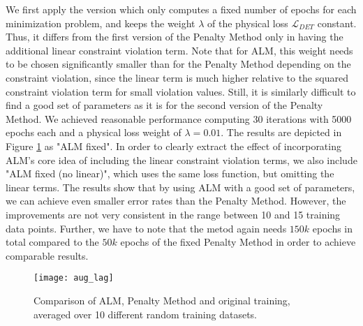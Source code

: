 We first apply the version which only computes a fixed number of epochs for each minimization problem, and keeps the weight $\lambda$ of the physical loss $\mathcal{L}_{DET}$ constant. Thus, it differs from the first version of the Penalty Method only in having the additional linear constraint violation term. Note that for ALM, this weight needs to be chosen significantly smaller than for the Penalty Method depending on the constraint violation, since the linear term is much higher relative to the squared constraint violation term for small violation values. Still, it is similarly difficult to find a good set of parameters as it is for the second version of the Penalty Method. We achieved reasonable performance computing 30 iterations with 5000 epochs each and a physical loss weight of $\lambda = 0.01$. The results are depicted in Figure \ref{fig:aug_lag} as "ALM fixed". In order to clearly extract the effect of incorporating ALM's core idea of including the linear constraint violation terms, we also include "ALM fixed (no linear)", which uses the same loss function, but omitting the linear terms. The results show that by using ALM with a good set of parameters, we can achieve even smaller error rates than the Penalty Method. However, the improvements are not very consistent in the range between 10 and 15 training data points. Further, we have to note that the metod again needs $150k$ epochs in total compared to the $50k$ epochs of the fixed Penalty Method in order to achieve comparable results.
\begin{figure}[H]
	\texttt{[image: aug\_lag]}
	\caption{Comparison of ALM, Penalty Method and original training, averaged over 10 different random training datasets.}
	\label{fig:aug_lag}
\end{figure}
